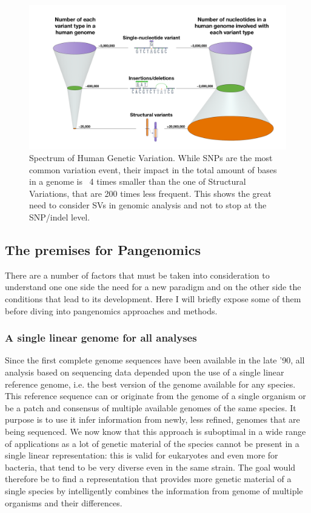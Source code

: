 \begin{figure}[h!]\clearpage
	\centering
	\includegraphics[width=.95\linewidth]{figures/background/genomic_spectrum.png}
	\caption[Spectrum of Human Genetic Variation.]{Spectrum of Human Genetic Variation. While SNPs are the most common variation event, their impact in the total amount of bases in a genome is ~4 times smaller than the one of Structural Variations, that are 200 times less frequent. This shows the great need to consider SVs in genomic analysis and not to stop at the SNP/indel level.\\}
	\label{fig:variation_spectrum}
\end{figure}

\subsection{The premises for Pangenomics}
There are a number of factors that must be taken into consideration to understand one one side the need for a new paradigm and on the other side the conditions that lead to its development. Here I will briefly expose some of them before diving into pangenomics approaches and methods. 
\subsubsection{A single linear genome for all analyses}
Since the first complete genome sequences have been available in the late '90, all analysis based on sequencing data depended upon the use of a single linear reference genome, i.e. the best version of the genome available for any species. This reference sequence can or originate from the genome of a single organism or be a patch and consensus of multiple available genomes of the same species. It purpose is to use it infer information from newly, less refined, genomes that are being sequenced. We now know that this approach is suboptimal in a wide range of applications as a lot of genetic material of the species cannot be present in a single linear representation: this is valid for eukaryotes and even more for bacteria, that tend to be very diverse even in the same strain. The goal would therefore be to find a representation that provides more genetic material of a single species by intelligently combines the information from genome of multiple organisms and their differences.

